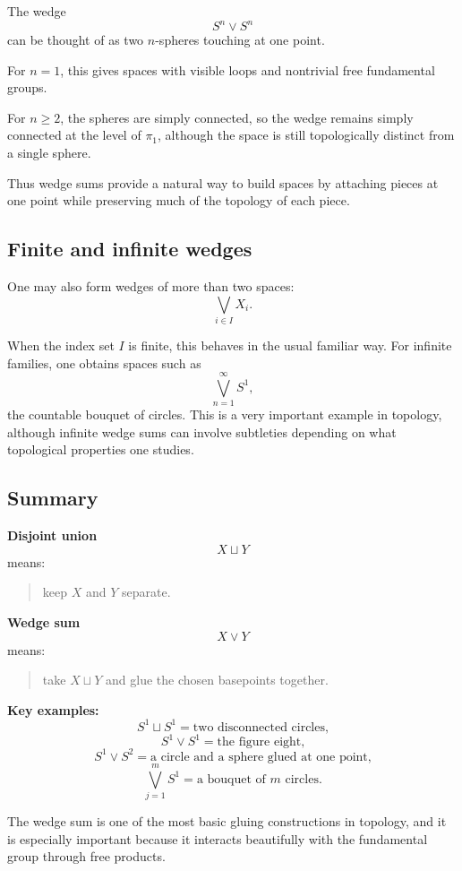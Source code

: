 \documentclass[12pt,a4paper]{article}
\theoremstyle{notespace}
\begin{document}
The wedge
\[
S^n\vee S^n
\]
can be thought of as two \(n\)-spheres touching at one point.

For \(n=1\), this gives spaces with visible loops and nontrivial free fundamental groups.

For \(n\geq 2\), the spheres are simply connected, so the wedge remains simply connected at the level of \(\pi_1\), although the space is still topologically distinct from a single sphere.

Thus wedge sums provide a natural way to build spaces by attaching pieces at one point while preserving much of the topology of each piece.

\bigskip

\subsection{ Finite and infinite wedges}

One may also form wedges of more than two spaces:
\[
\bigvee_{i\in I} X_i.
\]

When the index set \(I\) is finite, this behaves in the usual familiar way. For infinite families, one obtains spaces such as
\[
\bigvee_{n=1}^{\infty} S^1,
\]
the countable bouquet of circles. This is a very important example in topology, although infinite wedge sums can involve subtleties depending on what topological properties one studies.

\bigskip

\subsection{ Summary}

\textbf{Disjoint union}
\[
X\sqcup Y
\]
means:
\begin{quote}
	keep \(X\) and \(Y\) separate.
\end{quote}

\textbf{Wedge sum}
\[
X\vee Y
\]
means:
\begin{quote}
	take \(X\sqcup Y\) and glue the chosen basepoints together.
\end{quote}

\medskip

\textbf{Key examples:}
\[
S^1\sqcup S^1
=
\text{two disconnected circles,}
\]
\[
S^1\vee S^1
=
\text{the figure eight,}
\]
\[
S^1\vee S^2
=
\text{a circle and a sphere glued at one point,}
\]
\[
\bigvee_{j=1}^m S^1
=
\text{a bouquet of \(m\) circles.}
\]

The wedge sum is one of the most basic gluing constructions in topology, and it is especially important because it interacts beautifully with the fundamental group through free products.
\end{document}
